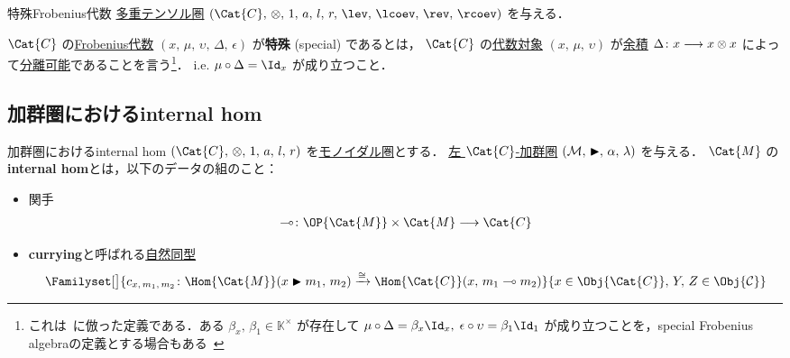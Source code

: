 \documentclass[TQFT_main]{subfiles}
\begin{document}
\begin{mydef}[label=def:special-Frobenius]{特殊Frobenius代数}
    \hyperref[def:tensorfusion-cat]{多重テンソル圏} $(\Cat{C},\, \otimes,\, 1,\, a,\, l,\,r,\, \lev,\, \lcoev,\, \rev,\, \rcoev)$ を与える．

    $\Cat{C}$ の\hyperref[def:Frobenius-alg]{Frobenius代数} $(x,\, \mu,\, \upsilon,\, \Delta,\, \epsilon)$ が\textbf{特殊} (special) であるとは，
    $\Cat{C}$ の\hyperref[def:algobj]{代数対象} $(x,\, \mu,\, \upsilon)$ が\hyperref[def:algobj]{余積} $\Delta \colon x \longrightarrow x \otimes x$ によって\hyperref[def:separable-alg]{分離可能}であることを言う\footnote{これは~\cite[p.17]{coecke2008quantummeasurementssums}に倣った定義である．ある $\beta_x,\, \beta_1 \in \mathbb{K}^\times$ が存在して $\mu \circ \Delta = \beta_x \Id_x,\; \epsilon \circ \upsilon = \beta_1 \Id_1$ が成り立つことを，special Frobenius algebraの定義とする場合もある~\cite[Definition 3.4-(i)]{Fuchs2002cm}}．
    i.e. $\mu \circ \Delta = \Id_x$ が成り立つこと．
\end{mydef}


\subsection{加群圏におけるinternal hom}


\begin{mydef}[label=def:internal-hom,breakable]{加群圏におけるinternal hom}
    $(\Cat{C},\, \otimes,\, 1,\, a,\, l,\, r)$ を\hyperref[redef:monoidal-category]{モノイダル圏}とする．
    \hyperref[def:modulecat]{左 $\Cat{C}$-加群圏} $(\mathcal{M},\, \blacktriangleright,\, \alpha,\, \lambda)$ を与える．
    $\Cat{M}$ の\textbf{internal hom}とは，以下のデータの組のこと：
    \begin{itemize}
        \item 関手
        \begin{align}
            \multimap \colon \OP{\Cat{M}} \times \Cat{M} \lto \Cat{C}
        \end{align}
        \item 
        \textbf{currying}と呼ばれる\hyperref[def:nat]{自然同型}
        \begin{align}
            \Familyset[\big]{c_{x,\, m_1,\, m_2} \colon \Hom{\Cat{M}}(x \btr m_1,\, m_2) \xrightarrow{\cong} \Hom{\Cat{C}}(x,\, m_1 \multimap m_2)}{x \in \Obj{\Cat{C}},\, Y,\, Z \in \Obj{\mathcal{C}}}
        \end{align}
    \end{itemize}    
\end{mydef}
\end{document}

